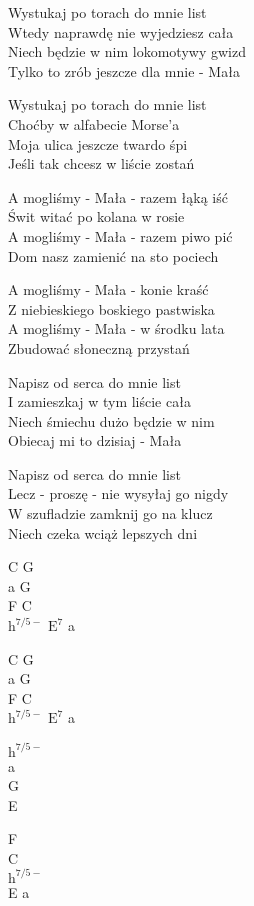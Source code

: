 \begin{text}
    Wystukaj po torach do mnie list\\
    Wtedy naprawdę nie wyjedziesz cała\\
    Niech będzie w nim lokomotywy gwizd\\
    Tylko to zrób jeszcze dla mnie - Mała

    Wystukaj po torach do mnie list\\
    Choćby w alfabecie Morse'a\\
    Moja ulica jeszcze twardo śpi\\
    Jeśli tak chcesz w liście zostań

    \vin A mogliśmy - Mała - razem łąką iść\\
    \vin Świt witać po kolana w rosie\\
    \vin A mogliśmy - Mała - razem piwo pić\\
    \vin Dom nasz zamienić na sto pociech

    \vin A mogliśmy - Mała - konie kraść\\
    \vin Z niebieskiego boskiego pastwiska\\
    \vin A mogliśmy - Mała - w środku lata\\
    \vin Zbudować słoneczną przystań

    Napisz od serca do mnie list\\
    I zamieszkaj w tym liście cała\\
    Niech śmiechu dużo będzie w nim\\
    Obiecaj mi to dzisiaj - Mała

    Napisz od serca do mnie list\\
    Lecz - proszę - nie wysyłaj go nigdy\\
    W szufladzie zamknij go na klucz\\
    Niech czeka wciąż lepszych dni
\end{text}
\begin{chord}
    C G\\
    a G\\
    F C\\
    $\mathrm{h^{7/5-}}$ $\mathrm{E^{7}}$ a

    C G\\
    a G\\
    F C\\
    $\mathrm{h^{7/5-}}$ $\mathrm{E^{7}}$ a

    $\mathrm{h^{7/5-}}$\\
    a\\
    G\\
    E

    F\\
    C\\
    $\mathrm{h^{7/5-}}$\\
    E a
\end{chord}
